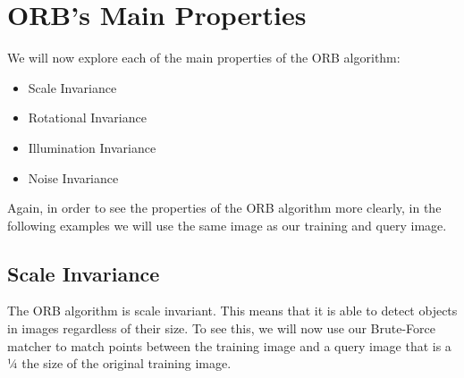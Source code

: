 \documentclass[11pt]{article}
\providecommand{\tightlist}{%
      \setlength{\itemsep}{0pt}\setlength{\parskip}{0pt}}
\begin{document}
    \hypertarget{orbs-main-properties}{%
\section{ORB's Main Properties}\label{orbs-main-properties}}

We will now explore each of the main properties of the ORB algorithm:

\begin{itemize}
\tightlist
\item
  Scale Invariance
\item
  Rotational Invariance
\item
  Illumination Invariance
\item
  Noise Invariance
\end{itemize}

Again, in order to see the properties of the ORB algorithm more clearly,
in the following examples we will use the same image as our training and
query image.

\hypertarget{scale-invariance}{%
\subsection{Scale Invariance}\label{scale-invariance}}

The ORB algorithm is scale invariant. This means that it is able to
detect objects in images regardless of their size. To see this, we will
now use our Brute-Force matcher to match points between the training
image and a query image that is a ¼ the size of the original training
image.
\end{document}

